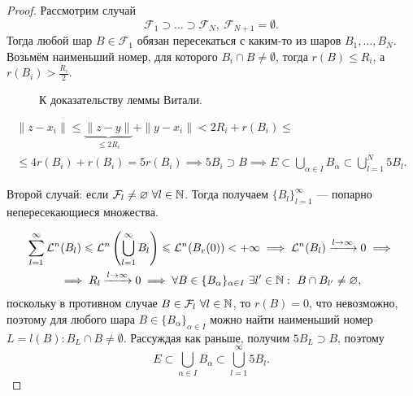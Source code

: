 \begin{proof}
    Рассмотрим случай
    \[\mathcal{F}_1 \supset \dots \supset \mathcal{F}_N, \ \mathcal{F}_{N+1} = \emptyset.\]
    Тогда любой шар $B \in \mathcal{F}_1$ обязан пересекаться с каким-то из шаров $B_1, \dots, B_N$.
    Возьмём наименьший номер, для которого $B_i \cap B \neq \emptyset$,
    тогда
    $r(B) \leqslant R_i$, а $r(B_i) > \frac{R_i}{2}$.

    \begin{figure}[H]
        \centering
        \caption{К доказательству леммы Витали.}
        \label{fig:3}
    \end{figure}

    \begin{multline*}
        \|z - x_i\| \leqslant \underbrace{\|z - y\|}_{\leqslant 2R_i} + \|y - x_i\| < 2R_i + r(B_i) 
        \leqslant\\\leqslant
        4r(B_i) + r(B_i) = 5r(B_i)
        \implies
        5B_i \supset B
        \implies E \subset \bigcup\limits_{\alpha \in I} B_\alpha \subset \bigcup\limits_{l=1}^{N} 5 B_l.
    \end{multline*} 
    
    Второй случай: если $\mathcal{F}_l \neq \varnothing \ \forall l \in \mathbb{N}$. Тогда получаем $\{B_l\}_{l=1}^\infty$ — попарно непересекающиеся множества.
    
    \begin{multline*}
        \sum\limits_{l=1}^{\infty} \mathcal{L}^n(B_l) \leqslant \mathcal{L}^n\left(\bigcup\limits_{l=1}^{\infty} B_l\right) \leqslant \mathcal{L}^n(B_r(0)) < +\infty
        \implies
        \mathcal{L}^n(B_l) \xrightarrow{l \to \infty} 0
        \implies\\\implies
        R_l \xrightarrow{l \to \infty} 0
        \implies
        \forall B \in \{B_\alpha\}_{\alpha \in I} \ \exists l' \in \N: \ B \cap B_{l'} \neq \emptyset,
    \end{multline*} 
    поскольку в противном случае $B \in \mathcal{F}_l \ \forall l \in \mathbb{N}$, то $r(B) = 0$, что невозможно, поэтому для любого шара $B \in \{B_\alpha\}_{\alpha \in I}$ можно найти наименьший номер $L = l(B): B_L \cap B \neq \emptyset$.
    Рассуждая как раньше, получим $5B_L \supset B$, поэтому
    \[E \subset \bigcup\limits_{\alpha \in I} B_\alpha \subset \bigcup\limits_{l=1}^{\infty} 5B_l.\]
\end{proof} 

